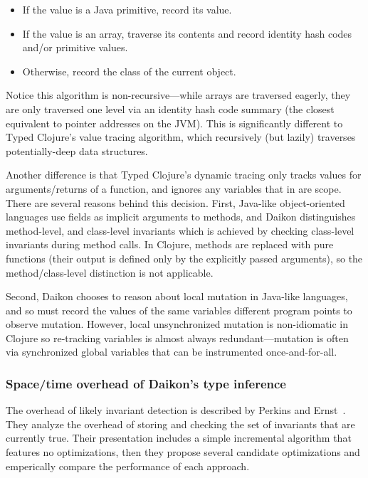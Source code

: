 \begin{itemize}
  \item If the value is a Java primitive, record its value.
  \item If the value is an array, traverse its contents and record identity hash codes
    and/or primitive values.
  \item Otherwise, record the class of the current object.
\end{itemize}

Notice this algorithm is non-recursive---while arrays are traversed eagerly, they
are only traversed one level via an identity hash code summary (the closest equivalent to
pointer addresses on the JVM).
This is significantly different to Typed Clojure's value tracing algorithm,
which recursively (but lazily) traverses potentially-deep data structures.

Another difference is that Typed Clojure's dynamic tracing only tracks
values for arguments/returns of a function, and ignores any variables
that in are scope. There are several reasons behind this decision.
First, Java-like object-oriented languages use fields as implicit
arguments to methods, and Daikon distinguishes method-level, and class-level
invariants which is achieved by checking class-level invariants during
method calls.
In Clojure, methods are replaced with pure functions (their output is defined only by the
explicitly passed arguments), so the method/class-level distinction is
not applicable.

Second, Daikon chooses to reason about local mutation in Java-like languages,
and so must record the values of the same variables different program points
to observe mutation. However, local unsynchronized mutation is non-idiomatic
in Clojure so re-tracking variables is almost always redundant---mutation is
often via synchronized global variables that can be instrumented once-and-for-all.

\subsubsection{Space/time overhead of Daikon's type inference}

The overhead of likely invariant detection
is described by Perkins and Ernst~\cite{Perkins04efficientincremental}.
They analyze the overhead of storing and checking the set of
invariants that are currently true.
Their presentation includes a simple incremental algorithm that
features no optimizations, then they propose several candidate
optimizations and emperically compare the performance of each
approach.


